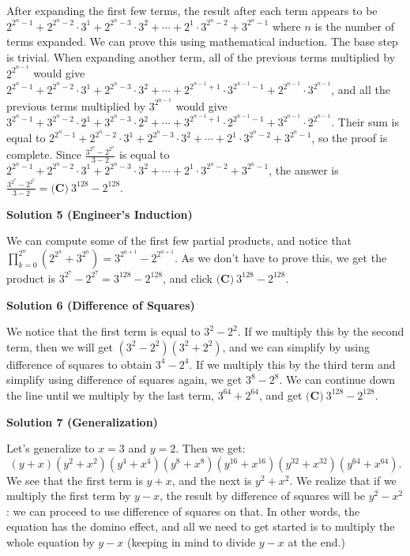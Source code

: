 \begin{enumerate}
After expanding the first few terms, the result after each term appears to be $2^{2^n-1} + 2^{2^n-2}\cdot{3^1} + 2^{2^n-3}\cdot{3^2} + \cdots + 2^1\cdot{3^{2^n-2}} + 3^{2^n-1}$ where $n$ is the number of terms expanded. We can prove this using mathematical induction. The base step is trivial. When expanding another term, all of the previous terms multiplied by $2^{2^{n-1}}$ would give $2^{2^n-1} + 2^{2^n-2}\cdot{3^1} + 2^{2^n-3}\cdot{3^2} + \cdots + 2^{2^{n-1}+1}\cdot{3^{2^{n-1}-1}} + 2^{2^{n-1}}\cdot{3^{2^{n-1}}}$, and all the previous terms multiplied by $3^{2^{n-1}}$ would give $3^{2^n-1} + 3^{2^n-2}\cdot{2^1} + 3^{2^n-3}\cdot{2^2} + \cdots + 3^{2^{n-1}+1}\cdot{2^{2^{n-1}-1}} + 3^{2^{n-1}}\cdot{2^{2^{n-1}}}$. Their sum is equal to $2^{2^n-1} + 2^{2^n-2}\cdot{3^1} + 2^{2^n-3}\cdot{3^2} + \cdots + 2^1\cdot{3^{2^n-2}} + 3^{2^n-1}$, so the proof is complete. Since $\frac{3^{2^n}-2^{2^n}}{3-2}$ is equal to $2^{2^n-1} + 2^{2^n-2}\cdot{3^1} + 2^{2^n-3}\cdot{3^2} + \cdots + 2^1\cdot{3^{2^n-2}} + 3^{2^n-1}$, the answer is $\frac{3^{2^7}-2^{2^7}}{3-2}=\boxed{\textbf{(C)} ~3^{128}-2^{128}}$.

 



\textbf{Solution 5 (Engineer's Induction)}

We can compute some of the first few partial products, and notice that $\prod_{k = 0}^{2^n} (2^{2^n}+3^{2^n}) = 3^{2^{n+1}} - 2^{2^{n+1}}$. As we don't have to prove this, we get the product is $3^{2^7} - 2^{2^7} = 3^{128} - 2^{128}$, and click $\boxed{\textbf{(C)} ~3^{128}-2^{128}}$. 

 



\textbf{Solution 6 (Difference of Squares)}

We notice that the first term is equal to $3^2 - 2^2$. If we multiply this by the second term, then we will get $(3^2 - 2^2)(3^2 + 2^2)$, and we can simplify by using difference of squares to obtain $3^4 - 2^4$. If we multiply this by the third term and simplify using difference of squares again, we get $3^8 - 2^8$. We can continue down the line until we multiply by the last term, $3^{64} + 2^{64}$, and get $\boxed{\textbf{(C)} ~3^{128}-2^{128}}$.

 



\textbf{Solution 7 (Generalization)}

Let’s generalize to $x=3$ and $y=2$. Then we get:
 \[(y+x)(y^2+x^2)(y^4+x^4)(y^8+x^8)(y^{16}+x^{16})(y^{32}+x^{32})(y^{64}+x^{64}).\]We see that the first term is $y+x$, and the next is $y^2+x^2$. We realize that if we multiply the first term by $y-x$, the result by difference of squares will be $y^2-x^2$: we can proceed to use difference of squares on that. In other words, the equation has the domino effect, and all we need to get started is to multiply the whole equation by $y-x$ (keeping in mind to divide $y-x$ at the end.)


\end{enumerate}
